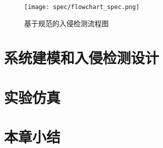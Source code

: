 \begin{figure}[!htb]
		\centering
		\texttt{[image: spec/flowchart\_spec.png]}
		\caption{基于规范的入侵检测流程图}
		\label{fig21}
	\end{figure}

\section{系统建模和入侵检测设计}
\label{sec:matheq}


\section{实验仿真}
\label{sec:insertimage}

\section{本章小结}
\label{sec:insertimage}

